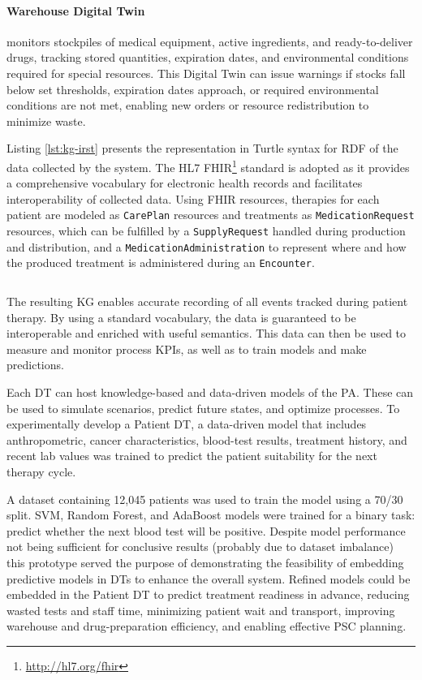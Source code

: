 \paragraph{Warehouse Digital Twin} monitors stockpiles of medical equipment, active ingredients, and ready-to-deliver drugs, tracking stored quantities, expiration dates, and environmental conditions required for special resources.  
%
This Digital Twin can issue warnings if stocks fall below set thresholds, expiration dates approach, or required environmental conditions are not met, enabling new orders or resource redistribution to minimize waste. 

\medskip

Listing \ref{lst:kg-irst} presents the representation in Turtle syntax for RDF of the data collected by the system. 
%
The HL7 FHIR\footnote{\url{http://hl7.org/fhir}} standard is adopted as it provides a comprehensive vocabulary for electronic health records and facilitates interoperability of collected data.
%
Using FHIR resources, therapies for each patient are modeled as \texttt{CarePlan} resources and treatments as \texttt{MedicationRequest} resources, which can be fulfilled by a \texttt{SupplyRequest} handled during production and distribution, and a \texttt{MedicationAdministration} to represent where and how the produced treatment is administered during an \texttt{Encounter}.

\begin{code}
\label{lst:kg-irst}
\inputminted{turtle}{listings/applications/KG_Partial.ttl}
\end{code}

The resulting \ac{KG} enables accurate recording of all events tracked during patient therapy. By using a standard vocabulary, the data is guaranteed to be interoperable and enriched with useful semantics.
%
This data can then be used to measure and monitor process KPIs, as well as to train models and make predictions.


Each \ac{DT} can host knowledge-based and data-driven models of the \ac{PA}.
These can be used to simulate scenarios, predict future states, and optimize processes.
%
To experimentally develop a Patient \ac{DT}, a data-driven model that includes anthropometric, cancer characteristics, blood-test results, treatment history, and recent lab values was trained to predict the patient suitability for the next therapy cycle.

A dataset containing 12,045 patients was used to train the model using a 70/30 split. SVM, Random Forest, and AdaBoost models were trained for a binary task: predict whether the next blood test will be positive.
%
Despite model performance not being sufficient for conclusive results (probably due to dataset imbalance)
this prototype served the purpose of demonstrating the feasibility of embedding predictive models in \acp{DT} to enhance the overall system.
%
Refined models could be embedded in the Patient \ac{DT} to predict treatment readiness in advance, reducing wasted tests and staff time, minimizing patient wait and transport, improving warehouse and drug-preparation efficiency, and enabling effective PSC planning.
